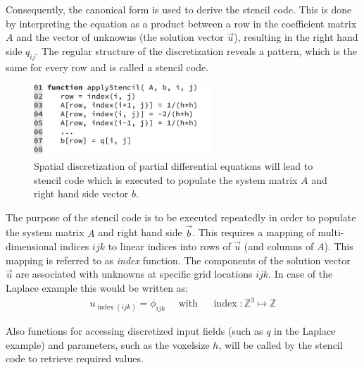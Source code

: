Consequently, the canonical form is used to derive the stencil code. This is done by interpreting the equation as a product between a row in the coefficient matrix $A$ and the vector of unknowns (the solution vector $\vec{u}$), resulting in the right hand side $q_{ij}$. The regular structure of the discretization reveals a pattern, which is the same for every row and is called a stencil code.

\begin{figure}[h]
\centering
\includegraphics[width=0.6\textwidth]{04_pn_method/figures/fig_code_stencil.pdf}
\caption{Spatial discretization of partial differential equations will lead to stencil code which is executed to populate the system matrix $A$ and right hand side vector $b$.}
\label{fig:pn_solver_stencil_code}
\end{figure}

The purpose of the stencil code is to be executed repeatedly in order to populate the system matrix $A$ and right hand side $\vec{b}$. This requires a mapping of multi-dimensional indices $ijk$ to linear indices into rows of $\vec{u}$ (and columns of $A$). This mapping is referred to as \emph{index} function. The components of the solution vector $\vec{u}$ are associated with unknowns at specific grid locations $ijk$. In case of the Laplace example this would be written as:
\begin{align}
u_{\operatorname{index}\left(ijk\right)} = \phi_{ijk}\quad\text{ with }\quad \operatorname{index}: \mathbb{Z}^3\mapsto\mathbb{Z}
\label{eq:pn_index_mapping}
\end{align}

Also functions for accessing discretized input fields (such as $q$ in the Laplace example) and parameters, such as the voxelsize $h$, will be called by the stencil code to retrieve required values.

